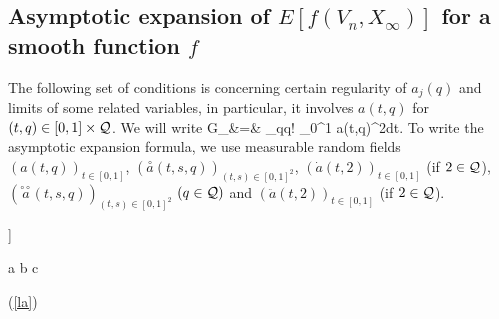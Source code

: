 \documentclass[a4paper,12pt]{article}
\numberwithin{equation}{section}
\numberwithin{equation}{section}
\newcommand{\colorr}{\color[rgb]{0.8,0,0}}
\newcommand{\colorr}{\color{black}}%
\def\dota{\stackrel{\circ}{a}\!} %
\def\ddota{\stackrel{\circ\circ}{a}\!}
\begin{document}
\subsection{Asymptotic expansion of $E[f(V_n,X_\infty)]$ for a smooth function $f$}
The following set of conditions is concerning certain regularity of $a_j(q)$ 
and limits of some related variables, in particular, it involves $a(t,q)$ for $(t,q)\in[0,1]\times{\cal Q}$. 
We will write 
\bea\label{202004201141}
G_\infty &=& \sum_{q\in\calq}q! \int_0^1 a(t,q)^2dt.
\eea
To write the asymptotic expansion formula, we use measurable random fields 
$(a(t,q))_{t\in[0,1]}$, $(\dota(t,s,q))_{(t,s)\in[0,1]^2}$, 
$(\dot{a}(t,2))_{t\in[0,1]}$ (if $2\in{\cal Q}$), 
$(\ddota(t,s,q))_{(t,s)\in[0,1]^2}$ 
$(q\in{\cal Q})$
{\colorr and $(\ddot{a}(t,2))_{t\in[0,1]}$ (if $2\in{\cal Q}$)}. 


\begin{en-text}
\bd
\im[[A\!\!]] 
\begin{enumerate}[(i)]
\im\label{la} a
\im b
\im c 
\end{enumerate}
(\ref{la})
\ed
\end{en-text}
\end{document}
